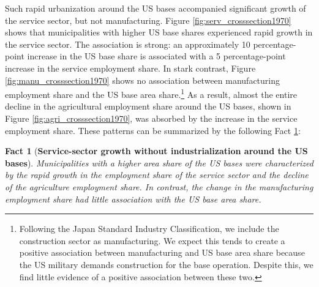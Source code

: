 \documentclass[12pt, unicode, a4paper]{article}
\newtheorem{fact}{Fact}
\newcommand{\1}{\mbox{1}\hspace{-0.25em}\mbox{l}} %
\begin{document}
Such rapid urbanization around the US bases accompanied significant growth of the service sector, but not manufacturing. Figure \ref{fig:serv_crosssection1970}  shows that  municipalities with higher US base shares experienced rapid growth in the service sector. The association is strong: an approximately 10 percentage-point increase in the US base share is associated with a 5 percentage-point increase in the service employment share. In stark contrast, Figure \ref{fig:manu_crosssection1970} shows no association between manufacturing employment share and the US base area share.\footnote{
Following the Japan Standard Industry Classification, we include the construction sector as manufacturing. We expect this tends to create a positive association between manufacturing and US base area share because the US military demands construction for the base operation. Despite this, we find little evidence of a positive association between these two. 
}
As a result, almost the entire decline in the agricultural employment share around the US bases, shown in Figure \ref{fig:agri_crosssection1970}, was absorbed by the increase in the service employment share. 
These patterns can be summarized by the following Fact \ref{result2}:

\begin{fact}[\textbf{Service-sector growth without industrialization around the US bases}]\label{result2}
Municipalities with a higher area share of the US bases were characterized by the rapid growth in the employment share of the service sector and the decline of the agriculture employment share. In contrast, the change in the manufacturing employment share had little association with the US base area share.
\end{fact}
\end{document}
